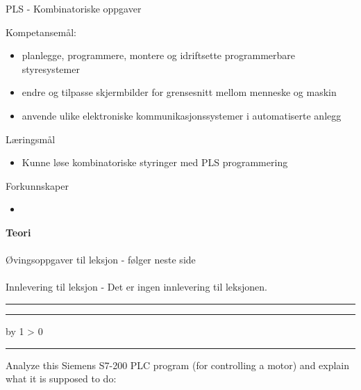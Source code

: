 \documentclass[12pt,a4paper]{article}
\def\oppgave{
            \advance\questnum by 1
            \ifnum \questnum > 0
                 \hrule
                 \vskip 3pt
                 \leftline{Oppgave \the\questnum}
                 \vskip 3pt \fi}
\begin{document}
\centerline{PLS - Kombinatoriske oppgaver}  \bigskip

Kompetansemål:
\begin{itemize}[noitemsep]

	\item planlegge, programmere, montere og idriftsette programmerbare styresystemer
	\item endre og tilpasse skjermbilder for grensesnitt mellom menneske og maskin
	\item anvende ulike elektroniske kommunikasjonssystemer i automatiserte anlegg
\end{itemize}
	Læringsmål
	\begin{itemize}[noitemsep]
		\item Kunne løse kombinatoriske styringer med PLS programmering
	\end{itemize}

	Forkunnskaper

	\begin{itemize}[noitemsep]
		\item 

	\end{itemize}
\textbf{Teori}\\\\
Øvingsoppgaver til leksjon - følger neste side\\\\
Innlevering til leksjon - Det er ingen innlevering til leksjonen. 
\bigskip 
\hrule
\vfil \eject

\bigskip 
 
\hrule

\vfil \eject

\vfil \eject

\oppgave{} 

Analyze this Siemens S7-200 PLC program (for controlling a motor) and explain what it is supposed to do:
\end{document}

